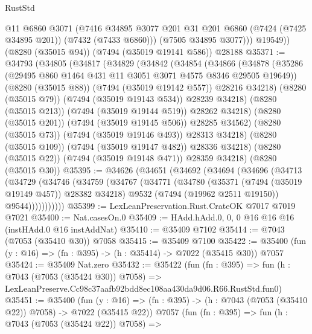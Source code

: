 \begin{lexlean}{RustStd}
\begin{coremodule}
            @11
            @6860
            @3071
            (@7416
              @34895
              @3077
              @201
              @31
              @201
              @6860
              (@7424 (@7425 @34895 @201))
              (@7432 (@7433 @6860)))
            (@7505 @34895 @3077)))
        @19549))
    (@8280 (@35015 @94))
    (@7494 (@35019 @19141 @586))
    @28188
@35371 := @34793
    (@34805
      (@34817
        (@34829
          (@34842
            (@34854
              (@34866
                (@34878
                  (@35286 (@29495 @860 @1464 @431 @11 @3051 @3071 @4575 @8346 @29505 @19649))
                  (@8280 (@35015 @88))
                  (@7494 (@35019 @19142 @557))
                  @28216
                  @34218)
                (@8280 (@35015 @79))
                (@7494 (@35019 @19143 @534))
                @28239
                @34218)
              (@8280 (@35015 @213))
              (@7494 (@35019 @19144 @519))
              @28262
              @34218)
            (@8280 (@35015 @201))
            (@7494 (@35019 @19145 @506))
            @28285
            @34562)
          (@8280 (@35015 @73))
          (@7494 (@35019 @19146 @493))
          @28313
          @34218)
        (@8280 (@35015 @109))
        (@7494 (@35019 @19147 @482))
        @28336
        @34218)
      (@8280 (@35015 @22))
      (@7494 (@35019 @19148 @471))
      @28359
      @34218)
    (@8280 (@35015 @30))
@35395 := @34626
    (@34651
      (@34692
        (@34694
          (@34696
            (@34713
              (@34729
                (@34746
                  (@34759
                    (@34767
                      (@34771
                        (@34780
                          (@35371 (@7494 (@35019 @19149 @457)) @28382 @34218)
                          @9532
                          (@7494 (@19962 @2511 @19150))
                          @9544)))))))))))
@35399 := LexLeanPreservation.Rust.CrateOK @7017 @7019 @7021
@35400 := Nat.casesOn.{0}
@35409 := HAdd.hAdd.{0, 0, 0} @16 @16 @16 (instHAdd.{0} @16 instAddNat)
@35410 := @35409 @7102
@35414 := @7043 (@7053 (@35410 @30)) @7058
@35415 := @35409 @7100
@35422 := @35400 (fun (y : @16) => (fn : @395) -> (h : @35414) -> @7022 (@35415 @30)) @7057
@35424 := @35409 Nat.zero
@35432 := @35422
    (fun (fn : @395) =>
    fun (h : @7043 (@7053 (@35424 @30)) @7058) =>
    LexLeanPreserve.Cc98c37aafb92bdd8ec108aa430da9d06.R66.RustStd.fun0)
@35451 := @35400
    (fun (y : @16) => (fn : @395) -> (h : @7043 (@7053 (@35410 @22)) @7058) -> @7022 (@35415 @22))
    @7057
    (fun (fn : @395) =>
    fun (h : @7043 (@7053 (@35424 @22)) @7058) =>

\end{coremodule}
\end{lexlean}
